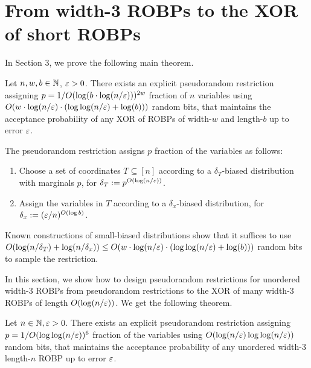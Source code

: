 
\section{From width-3 ROBPs to the XOR of short ROBPs}
In Section 3, we prove the following main theorem.
\begin{thm}\label{thm:main}
Let $n,w,b\in {\mathbb{N}}$, $\varepsilon>0$. There exists an explicit pseudorandom restriction assigning $p = 1/O(\log(b \cdot \log(n/\varepsilon)))^{2w}$ fraction of  $n$ variables using $O(w \cdot \log (n/\varepsilon) \cdot (\log\log(n/\varepsilon) + \log(b)))$ random bits, that maintains the acceptance probability of any XOR of ROBPs of width-$w$ and length-$b$ up to error $\varepsilon$.
\end{thm}
The pseudorandom restriction assigns $p$ fraction of the variables as follows: 
\begin{enumerate}
	\item Choose a set of coordinates $T \subseteq [n]$ according to a $\delta_T$-biased distribution with marginals $p$, for $\delta_T := p^{ O(\log(n/\varepsilon))}$.
	\item Assign the variables in $T$ according to a $\delta_x$-biased distribution, for $\delta_x := (\varepsilon/n)^{O(\log b)}$.
\end{enumerate}
Known constructions of small-biased distributions \cite{NaorNaor93,AlonGHP92,Ta-Shma17} show that it suffices to use $O(\log(n/\delta_T) + \log(n/\delta_x)) \le O(w \cdot \log (n/\varepsilon) \cdot (\log\log(n/\varepsilon) + \log(b)))$ random bits to sample the restriction.

In this section, we show how to design pseudorandom restrictions for unordered width-3 ROBPs from pseudorandom restrictions to the XOR of many width-3 ROBPs of length $O(\log (n/\varepsilon))$.
%
We get the following theorem.

\begin{thm}
\label{thm:main_two_steps}
Let $n\in {\mathbb{N}}, \varepsilon>0$. There exists an explicit pseudorandom restriction assigning $p = 1/O(\log \log(n/\varepsilon))^{6}$ fraction of the variables using $O(\log (n/\varepsilon) \log\log(n/\varepsilon))$ random bits, that maintains the acceptance probability of any unordered width-$3$ length-$n$ ROBP up to error $\varepsilon$.
\end{thm}


